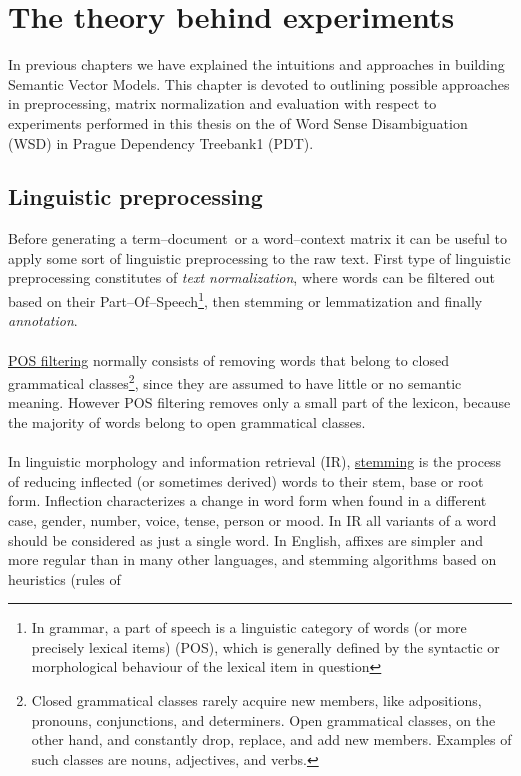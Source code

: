 \chapter{The theory behind experiments}
In previous chapters we have explained the intuitions and approaches in building Semantic Vector Models. This chapter is devoted to outlining possible approaches in preprocessing, matrix normalization and evaluation with respect to experiments performed in this thesis on the of Word Sense Disambiguation (WSD) in Prague Dependency Treebank1 (PDT).

\section{Linguistic preprocessing}\label{linguisticPreprocessing}
Before generating a term--document\ or a  word--context matrix it can be useful to apply some sort of linguistic preprocessing to the raw text. First type of  linguistic preprocessing constitutes of \textit{text normalization}, where words can be filtered out based on their Part--Of--Speech\footnote{In grammar, a part of speech is a linguistic category of words (or more precisely lexical items) (POS), which is generally defined by the syntactic or morphological behaviour of the lexical item in question}, then stemming or lemmatization and finally \textit{annotation}.
\\\\  \underline{POS filtering} normally consists of removing words that belong to closed grammatical 
classes\footnote{Closed grammatical classes rarely acquire new members, like adpositions, pronouns, 
conjunctions, and determiners. Open grammatical classes, on the other hand, and constantly drop, replace, 
and add new members. Examples of such classes are nouns, adjectives, and verbs.}, since they are assumed 
to have little or no semantic meaning. However POS filtering removes only a small part of the lexicon, because 
the majority of words belong to open grammatical classes.  
\\\\  In linguistic morphology and information retrieval (IR), \underline{stemming} is the process of 
reducing inflected (or sometimes derived) words to their stem, base or root form. Inflection characterizes 
a change in word form when found in a different case, gender, number, voice, tense, person or mood. In 
IR all variants of a word should be considered as just a single word. In English, affixes are simpler and 
more regular than in many other languages, and stemming algorithms based on heuristics (rules of 
